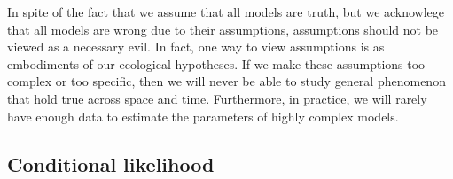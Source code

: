 In spite of the fact that we assume that all models are truth, but we
acknowlege that all models are wrong due to their assumptions,
assumptions should not be viewed as a necessary evil. In fact, one way
to view assumptions is as embodiments of our ecological hypotheses. If
we make these assumptions too complex or too specific, then we will
never be able to study general phenomenon that hold true across space
and time. Furthermore, in practice, we will rarely have enough data to estimate the
parameters of highly complex models.

\subsection{Conditional likelihood}

